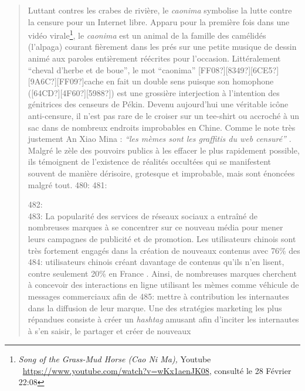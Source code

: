 \begin{quote}
\begin{description}
Luttant contres les crabes de rivi\`ere, le \textit{caonima }symbolise la lutte contre la censure pour un Internet libre. Apparu pour la premi\`ere fois dans une vid\'eo virale\footnote{ \textit{Song of the Grass-Mud Horse (Cao Ni Ma), }Youtube \ \url{https://www.youtube.com/watch?v=wKx1aenJK08}, consult\'e le 28 F\'evrier 22:08\par }, le \textit{caonima} est un animal de la famille des cam\'elid\'es (l{\textquoteright}alpaga) courant fi\`erement dans les pr\'es sur une petite musique de dessin anim\'e aux paroles enti\`erement r\'e\'ecrites pour l{\textquoteright}occasion. Litt\'eralement {\textquotedblleft}cheval d{\textquoteright}herbe et de boue{\textquotedblright}, le mot {\textquotedblleft}caonima{\textquotedblright} [FF08?][8349?][6CE5?][9A6C?][FF09?]cache en fait un double sens puisque son homophone ([64CD?][4F60?][5988?]) est une grossi\`ere interjection \`a l{\textquoteright}intention des g\'enitrices des censeurs de P\'ekin. Devenu aujourd{\textquoteright}hui une v\'eritable ic\^one anti-censure, il n{\textquoteright}est pas rare de le croiser sur un tee-shirt ou accroch\'e \`a un sac dans de nombreux endroits improbables en Chine. Comme le note tr\`es justement An Xiao Mina : \textit{{\textquotedblleft}les m\`emes sont les graffitis du web censur\'e{\textquotedblright}} \cite{Mina2012}. Malgr\'e le z\`ele des pouvoirs publics \`a les effacer le plus rapidement possible, ils t\'emoignent de l{\textquoteright}existence de r\'ealit\'es occult\'ees qui se manifestent souvent de mani\`ere d\'erisoire, grotesque et improbable, mais sont \'enonc\'ees malgr\'e tout. 
480: 
481: \item[Publicit\'e et marketing viral]
482: \hfill \\
483: La popularit\'e des services de r\'eseaux sociaux a entra\^in\'e de nombreuses marques \`a se concentrer sur ce nouveau m\'edia pour mener leurs campagnes de publicit\'e et de promotion. Les utilisateurs chinois sont tr\`es fortement engag\'es dans la cr\'eation de nouveaux contenus avec 76\% des
484: utilisateurs chinois cr\'eant davantage de contenus qu{\textquoteright}ils n{\textquoteright}en lisent, contre seulement 20\% en France \cite{Forrester2012}. Ainsi, de nombreuses marques cherchent \`a concevoir des interactions en ligne utilisant les m\`emes comme v\'ehicule de messages commerciaux afin de
485: mettre \`a contribution les internautes dans la diffusion de leur marque. Une des strat\'egies marketing les plus r\'epandues consiste \`a cr\'eer un \textit{hashtag} amusant afin d{\textquoteright}inciter les internautes \`a s{\textquoteright}en saisir, le partager et cr\'eer de nouveaux

\end{description}
\end{quote}
